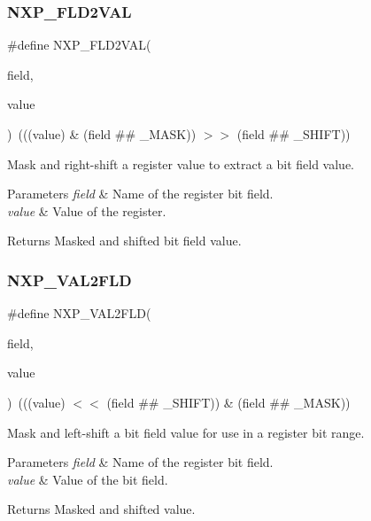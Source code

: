 \subsubsection{\texorpdfstring{N\+X\+P\+\_\+\+F\+L\+D2\+V\+AL}{NXP\_FLD2VAL}}
{\footnotesize\ttfamily \#define N\+X\+P\+\_\+\+F\+L\+D2\+V\+AL(\begin{DoxyParamCaption}\item[{}]{field,  }\item[{}]{value }\end{DoxyParamCaption})~(((value) \& (field \#\# \+\_\+\+M\+A\+SK)) $>$$>$ (field \#\# \+\_\+\+S\+H\+I\+FT))}



Mask and right-\/shift a register value to extract a bit field value. 


\begin{DoxyParams}{Parameters}
{\em field} & Name of the register bit field. \\
\hline
{\em value} & Value of the register. \\
\hline
\end{DoxyParams}
\begin{DoxyReturn}{Returns}
Masked and shifted bit field value. 
\end{DoxyReturn}
\mbox{\label{group___bit___field___generic___macros_ga174e73af51fd6bf7974359c28ec60c0d}} 
\subsubsection{\texorpdfstring{N\+X\+P\+\_\+\+V\+A\+L2\+F\+LD}{NXP\_VAL2FLD}}
{\footnotesize\ttfamily \#define N\+X\+P\+\_\+\+V\+A\+L2\+F\+LD(\begin{DoxyParamCaption}\item[{}]{field,  }\item[{}]{value }\end{DoxyParamCaption})~(((value) $<$$<$ (field \#\# \+\_\+\+S\+H\+I\+FT)) \& (field \#\# \+\_\+\+M\+A\+SK))}



Mask and left-\/shift a bit field value for use in a register bit range. 


\begin{DoxyParams}{Parameters}
{\em field} & Name of the register bit field. \\
\hline
{\em value} & Value of the bit field. \\
\hline
\end{DoxyParams}
\begin{DoxyReturn}{Returns}
Masked and shifted value. 
\end{DoxyReturn}
